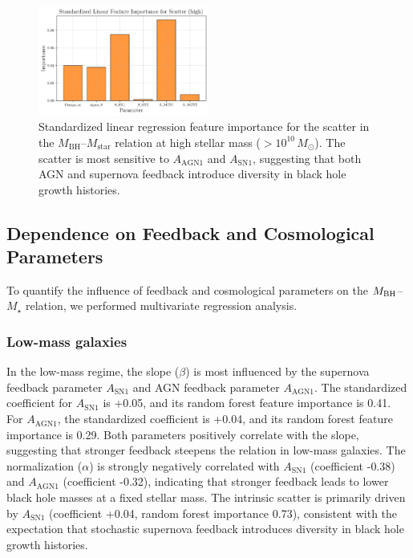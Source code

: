 \documentclass[twocolumn]{aastex631}
\begin{document}
\begin{figure}[ht!]
    \centering
    \includegraphics[width=0.5\textwidth]{plots/featimp_StandardizedLinear_Scatter_high_118_20250423_182621.png}
    \caption{Standardized linear regression feature importance for the scatter in the $M_\mathrm{BH}$--$M_\mathrm{star}$ relation at high stellar mass ($>10^{10}\,M_\odot$). The scatter is most sensitive to $A_\mathrm{AGN1}$ and $A_\mathrm{SN1}$, suggesting that both AGN and supernova feedback introduce diversity in black hole growth histories.
}
    \label{fig:featimp_scatter_linear_high}
\end{figure}

\subsection{Dependence on Feedback and Cosmological Parameters}

To quantify the influence of feedback and cosmological parameters on the $M_{\rm BH}$--$M_{\star}$ relation, we performed multivariate regression analysis.

\subsubsection{Low-mass galaxies}

In the low-mass regime, the slope ($\beta$) is most influenced by the supernova feedback parameter $A_\mathrm{SN1}$ and AGN feedback parameter $A_\mathrm{AGN1}$. The standardized coefficient for $A_\mathrm{SN1}$ is +0.05, and its random forest feature importance is 0.41. For $A_\mathrm{AGN1}$, the standardized coefficient is +0.04, and its random forest feature importance is 0.29. Both parameters positively correlate with the slope, suggesting that stronger feedback steepens the relation in low-mass galaxies. The normalization ($\alpha$) is strongly negatively correlated with $A_\mathrm{SN1}$ (coefficient -0.38) and $A_\mathrm{AGN1}$ (coefficient -0.32), indicating that stronger feedback leads to lower black hole masses at a fixed stellar mass. The intrinsic scatter is primarily driven by $A_\mathrm{SN1}$ (coefficient +0.04, random forest importance 0.73), consistent with the expectation that stochastic supernova feedback introduces diversity in black hole growth histories.
\end{document}
